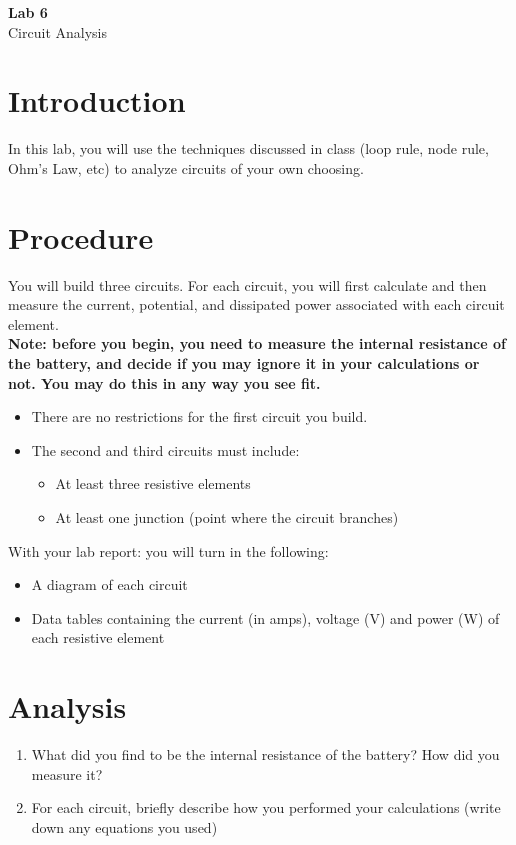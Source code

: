 \documentclass{article}
\begin{document}
\fancyfoot[C]{\thepage}
\vspace*{0cm}
\begin{center}
	{\LARGE \textbf{Lab 6}}\\
	\vspace{.5cm}
	{\Large Circuit Analysis}
\end{center}

\section*{Introduction}
In this lab, you will use the techniques discussed in class (loop rule, node rule, Ohm's Law, etc) to analyze circuits of your own choosing.

\section*{Procedure}
You will build three circuits. For each circuit, you will first calculate and then measure the current, potential, and dissipated power associated with each circuit element.\\

\textbf{Note: before you begin, you need to measure the internal resistance of the battery, and decide if you may ignore it in your calculations or not. You may do this in any way you see fit.}

\begin{itemize}
	\item There are no restrictions for the first circuit you build.
	\item The second and third circuits must include:
	\begin{itemize}
		\item At least three resistive elements
		\item At least one junction (point where the circuit branches)
	\end{itemize}
\end{itemize}
With your lab report: you will turn in the following:
\begin{itemize}
	\item A diagram of each circuit
	\item Data tables containing the current (in amps), voltage (V) and power (W) of each resistive element
\end{itemize}
\section*{Analysis}
\begin{enumerate}
	\item What did you find to be the internal resistance of the battery? How did you measure it?
	\item For each circuit, briefly describe how you performed your calculations (write down any equations you used)
\end{enumerate}
\end{document}
